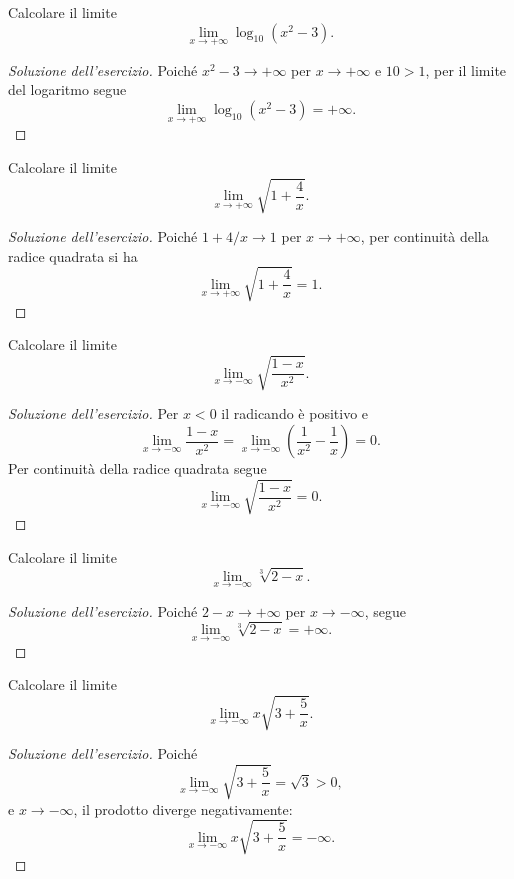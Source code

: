 \begin{exercise}
\label{ex:limiti-foglio-2311-12}
Calcolare il limite
\[
  \lim_{x\to+\infty}\log_{10}(x^2-3).
\]
\end{exercise}
\begin{proof}[Soluzione dell'esercizio]
Poiché $x^2-3\to+\infty$ per $x\to+\infty$ e $10>1$,
per il limite del logaritmo segue
\[
  \lim_{x\to+\infty}\log_{10}(x^2-3)=+\infty.
\]
\end{proof}

\begin{exercise}
\label{ex:limiti-foglio-2311-13}
Calcolare il limite
\[
  \lim_{x\to+\infty}\sqrt{1+\frac4x}.
\]
\end{exercise}
\begin{proof}[Soluzione dell'esercizio]
Poiché $1+4/x\to1$ per $x\to+\infty$,
per continuità della radice quadrata si ha
\[
  \lim_{x\to+\infty}\sqrt{1+\frac4x}=1.
\]
\end{proof}

\begin{exercise}
\label{ex:limiti-foglio-2311-14}
Calcolare il limite
\[
  \lim_{x\to-\infty}\sqrt{\frac{1-x}{x^2}}.
\]
\end{exercise}
\begin{proof}[Soluzione dell'esercizio]
Per $x<0$ il radicando è positivo e
\[
  \lim_{x\to-\infty}\frac{1-x}{x^2}
  =\lim_{x\to-\infty}\left(\frac1{x^2}-\frac1x\right)=0.
\]
Per continuità della radice quadrata segue
\[
  \lim_{x\to-\infty}\sqrt{\frac{1-x}{x^2}}=0.
\]
\end{proof}

\begin{exercise}
\label{ex:limiti-foglio-2311-16}
Calcolare il limite
\[
  \lim_{x\to-\infty}\sqrt[3]{2-x}.
\]
\end{exercise}
\begin{proof}[Soluzione dell'esercizio]
Poiché $2-x\to+\infty$ per $x\to-\infty$,
segue
\[
  \lim_{x\to-\infty}\sqrt[3]{2-x}=+\infty.
\]
\end{proof}

\begin{exercise}
\label{ex:limiti-foglio-2311-17}
Calcolare il limite
\[
  \lim_{x\to-\infty}x\sqrt{3+\frac5x}.
\]
\end{exercise}
\begin{proof}[Soluzione dell'esercizio]
Poiché
\[
  \lim_{x\to-\infty}\sqrt{3+\frac5x}=\sqrt3>0,
\]
e $x\to-\infty$, il prodotto diverge negativamente:
\[
  \lim_{x\to-\infty}x\sqrt{3+\frac5x}=-\infty.
\]
\end{proof}
